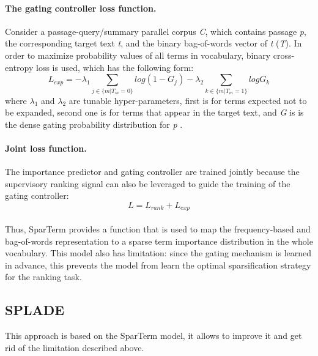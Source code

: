 \documentclass[
    twocolumn,
]{ceurart}
\begin{document}
    \paragraph{The gating controller loss function.}
    Consider a passage-query/summary parallel corpus \emph{C}, which contains passage \emph{p}, the
    corresponding target text \emph{t}, and the binary bag-of-words vector of \emph{t} (\emph{T}).
    In order to maximize probability values of all terms in vocabulary, binary cross-entropy loss
    is used, which has the following form:
    \begin{equation}
        L_{exp}=-\lambda_1\sum_{j \in \{m|T_m=0\}}log(1-G_j)-\lambda_2\sum_{k \in \{m|T_m=1\}}logG_k
    \end{equation}
    where $\lambda_1$ and $\lambda_2$ are tunable hyper-parameters, first is for terms expected not to be
    expanded, second one is for terms that appear in the target text, and \emph{G} is is the dense
    gating probability distribution for \emph{p} \cite{SparTerm}.

    \paragraph{Joint loss function.}
    The importance predictor and gating controller are trained jointly because the supervisory
    ranking signal can also be leveraged to guide the training of the gating controller:
    \begin{equation}
        L = L_{rank} + L_{exp}
    \end{equation}\\

    Thus, SparTerm provides a function that is used to map the frequency-based and bag-of-words
    representation to a sparse term importance distribution in the whole vocabulary.
    This model also has limitation: since the gating mechanism is learned in advance, this prevents
    the model from learn the optimal sparsification strategy for the ranking task.

    \subsection{SPLADE}

    This approach is based on the SparTerm model, it allows to improve it and get rid
    of the limitation described above.
\end{document}
